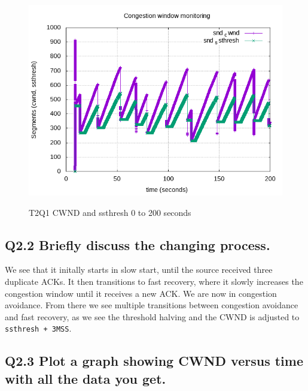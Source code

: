 \documentclass{article}
\begin{document}
\begin{figure}[H]
	\includegraphics{lab1-group1-task2-question1.png}
	\label{fig:q21}
	\caption{T2Q1 CWND and ssthresh 0 to 200 seconds}
\end{figure}


\subsection{Q2.2 Briefly discuss the changing process.}

We see that it initally starts in slow start, until the source received three
duplicate ACKs. It then transitions to fast recovery, where it slowly increases
the congestion window until it receives a new ACK. We are now in congestion
avoidance. From there we see multiple transitions between congestion avoidance
and fast recovery, as we see the threshold halving and the CWND is adjusted to
\texttt{ssthresh + 3MSS}.


\subsection{Q2.3 Plot a graph showing CWND versus time with all the data you get.}
\end{document}
